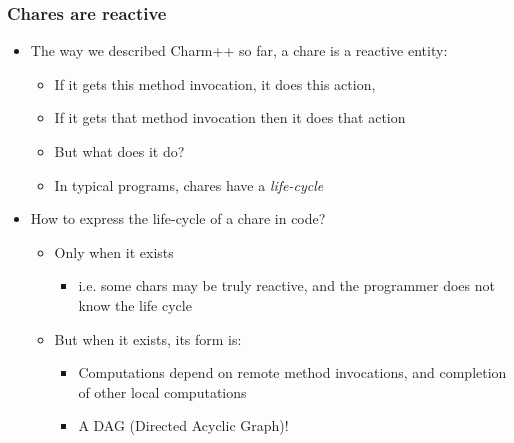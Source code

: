 
\begin{frame}[fragile]
  \frametitle{Chares are reactive}
  \begin{itemize}
    \item The way we described Charm++ so far, a chare is a reactive entity:
      \begin{itemize}
      \item If it gets this method invocation, it does this action,
      \item If it gets that method invocation then it does that action
      \item But what does it do?
      \item In typical programs, chares have a \emph{life-cycle}
      \end{itemize}
    \item How to express the life-cycle of a chare in code?
      \begin{itemize}
      \item Only when it exists
        \begin{itemize}
        \item i.e. some chars may be truly reactive, and the programmer does
          not know the life cycle
        \end{itemize}
      \item But when it exists, its form is:
        \begin{itemize}
        \item Computations depend on remote method invocations, and completion
          of other local computations
        \item A DAG (Directed Acyclic Graph)!
        \end{itemize}
      \end{itemize}
  \end{itemize}
\end{frame}

